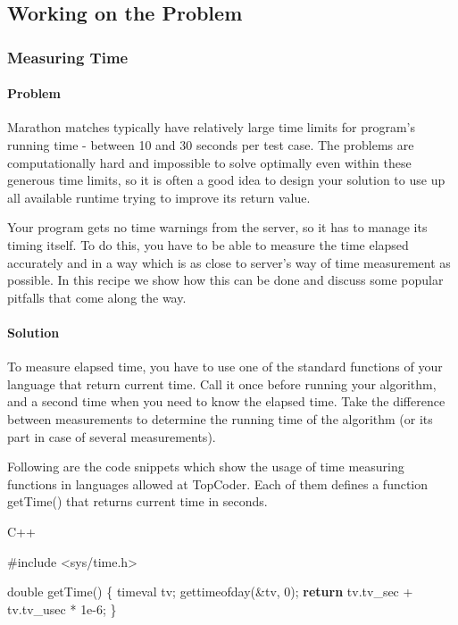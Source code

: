 \documentclass[]{article}
\date{}
\newenvironment{Shaded}{}{}
\newcommand{\ControlFlowTok}[1]{\textcolor[rgb]{0.00,0.44,0.13}{\textbf{#1}}}
\newcommand{\DataTypeTok}[1]{\textcolor[rgb]{0.56,0.13,0.00}{#1}}
\newcommand{\DecValTok}[1]{\textcolor[rgb]{0.25,0.63,0.44}{#1}}
\newcommand{\FloatTok}[1]{\textcolor[rgb]{0.25,0.63,0.44}{#1}}
\newcommand{\ImportTok}[1]{#1}
\newcommand{\NormalTok}[1]{#1}
\newcommand{\PreprocessorTok}[1]{\textcolor[rgb]{0.74,0.48,0.00}{#1}}
\let\oldparagraph\paragraph
\renewcommand{\paragraph}[1]{\oldparagraph{#1}\mbox{}}
\begin{document}
\hypertarget{working-on-the-problem}{%
\subsection{Working on the Problem}\label{working-on-the-problem}}

\hypertarget{measuring-time}{%
\subsubsection{Measuring Time}\label{measuring-time}}

\hypertarget{problem}{%
\paragraph{Problem}\label{problem}}

Marathon matches typically have relatively large time limits for
program's running time - between 10 and 30 seconds per test case. The
problems are computationally hard and impossible to solve optimally even
within these generous time limits, so it is often a good idea to design
your solution to use up all available runtime trying to improve its
return value.

Your program gets no time warnings from the server, so it has to manage
its timing itself. To do this, you have to be able to measure the time
elapsed accurately and in a way which is as close to server's way of
time measurement as possible. In this recipe we show how this can be
done and discuss some popular pitfalls that come along the way.

\hypertarget{solution}{%
\paragraph{Solution}\label{solution}}

To measure elapsed time, you have to use one of the standard functions
of your language that return current time. Call it once before running
your algorithm, and a second time when you need to know the elapsed
time. Take the difference between measurements to determine the running
time of the algorithm (or its part in case of several measurements).

Following are the code snippets which show the usage of time measuring
functions in languages allowed at TopCoder. Each of them defines a
function getTime() that returns current time in seconds.

C++

\begin{Shaded}
\begin{Highlighting}[]

\PreprocessorTok{#include }\ImportTok{<sys/time.h>}

\DataTypeTok{double}\NormalTok{ getTime() \{}
\NormalTok{   timeval tv;}
\NormalTok{   gettimeofday(&tv, }\DecValTok{0}\NormalTok{);}
   \ControlFlowTok{return}\NormalTok{ tv.tv_sec + tv.tv_usec * }\FloatTok{1e-6}\NormalTok{;}
\NormalTok{\}}
\end{Highlighting}
\end{Shaded}
\end{document}
